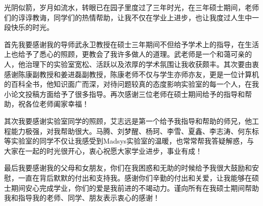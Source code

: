 \begin{acknowledgement}
	光阴似箭，岁月如流水，转眼已在园子里度过了三年时光，在三年硕士期间，老师们的谆谆教诲，同学们的热情帮助，让我不仅在学业上进步，也让我度过人生中一段快乐的时光。
	
	首先我要感谢我的导师武永卫教授在硕士三年期间不但给予学术上的指导，在生活上也给予了悉心的照顾，更教会了我许多做人的道理。武老师是一个和蔼可亲的人，他治理下的实验室宽松、活跃以及浓厚的学术氛围让我收获颇丰。其次要由衷感谢陈康副教授和姜进磊副教授，陈康老师不仅与学生亦师亦友，更是一位计算机的百科全书，他知识面广而深，对待问题较真的态度影响实验室的每一个人，在我小论文投稿方面给予了很多指导。再次感谢三位老师在硕士期间给予的指导和帮助，祝各位老师阖家幸福！
	
	其次我要感谢实验室同学的照顾，艾志远是第一个给予我指导和帮助的师兄，他工程能力极强，对我帮助很大。马腾、刘梦醒、杨珂、李雪、夏鑫、李志涛、何东标等实验室的同学不仅让我感受到Madsys实验室的温暖，也常常帮我答疑解惑，与大家在一起的时光很开心，衷心祝愿大家学业进步，事业有成！
	
	最后我要感谢我的父母和女朋友，你们在我困惑和无助的时候给予我很大鼓励和安慰，一直在背后默默的付出和支持我。感谢你们辛勤的付出和关爱，让我能够在硕士期间安心完成学业，你们的爱是我前进的不竭动力。谨向所有在我硕士期间帮助我和指导我的老师、同学、朋友表示衷心的感谢！
	
\end{acknowledgement}
